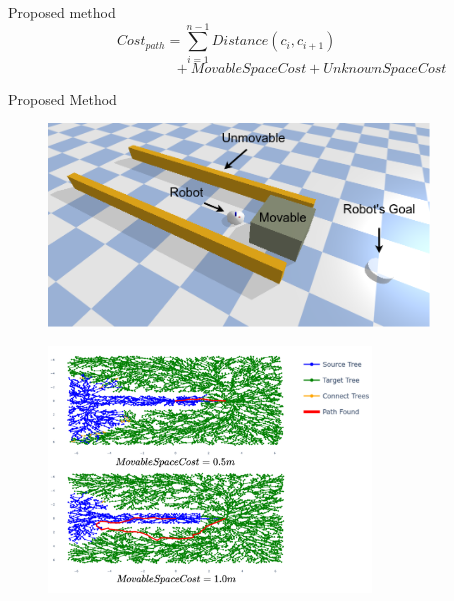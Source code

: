 \begin{frame}[fragile]{Proposed method} 
  \[\mathit{Cost_{path}} =  \sum_{i=1}^{n-1} \mathit{Distance}(c_i, c_{i+1}) \hspace{2cm}\]
  \[\hspace{3cm}+ \mathit{MovableSpaceCost} + \mathit{UnknownSpaceCost} \]
\end{frame}

\begin{frame}[fragile]{Proposed Method} 
\begin{center}
\begin{figure}[H]
\includegraphics[width=0.9\textwidth]{figures/proposed_method/push_or_drive}
\end{figure}
\end{center}

\end{frame}

\begin{frame}[fragile]{}
\begin{center}
\begin{figure}[H]
\vspace{-0.3cm}
\hspace{0.9cm}
\includegraphics[width=0.765\textwidth]{figures/proposed_method/push_or_drive_planned.drawio.png} 
\end{figure}
\end{center}
\end{frame}
